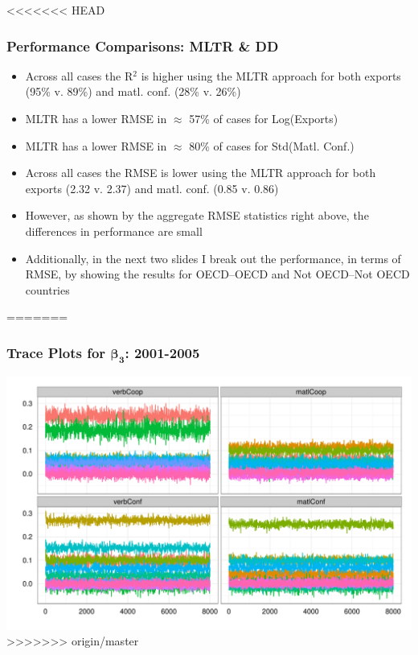 \documentclass[10pt, compress]{beamer}
\begin{document}
\frame
{
<<<<<<< HEAD
  \frametitle{Performance Comparisons: MLTR \& DD}

\begin{itemize}
\item Across all cases the R$^{2}$ is higher using the MLTR approach for both exports (95\% v. 89\%) and matl. conf. (28\% v. 26\%)
\item MLTR has a lower RMSE in $\approx$ 57\% of cases for Log(Exports)
\item MLTR has a lower RMSE in $\approx$ 80\% of cases for Std(Matl. Conf.)
\item Across all cases the RMSE is lower using the MLTR approach for both exports (2.32 v. 2.37) and matl. conf. (0.85 v. 0.86)
\item However, as shown by the aggregate RMSE statistics right above, the differences in performance are small
\item Additionally, in the next two slides I break out the performance, in terms of RMSE, by showing the results for OECD--OECD and Not OECD--Not OECD countries
\end{itemize}

=======
\frametitle{Trace Plots for $\boldsymbol{\beta_{3}}$: 2001-2005}
  \centering
  \includegraphics[width=1\textwidth]{2001-2005_trace.pdf}
>>>>>>> origin/master
}
\end{document}
